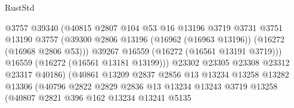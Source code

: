 \begin{lexlean}{RustStd}
\begin{coremodule}
                                        @3757
                                        @39340
                                        (@40815
                                          @2807
                                          @104
                                          @53
                                          @16
                                          @13196
                                          @3719
                                          @3731
                                          @3751
                                          @13190
                                          @3757
                                          (@39300
                                            @2806
                                            @13196
                                            (@16962 (@16963 @13196))
                                            (@16272 (@16968 @2806 @53)))
                                          @39267
                                          @16559
                                          (@16272 (@16561 @13191 @3719)))
                                        @16559
                                        (@16272 (@16561 @13181 @13199)))
                                      @23302
                                      @23305
                                      @23308
                                      @23312
                                      @23317
                                      @40186)
                                    (@40861
                                      @13209
                                      @2837
                                      @2856
                                      @13
                                      @13234
                                      @13258
                                      @13282
                                      @13306
                                      (@40796
                                        @2822
                                        @2829
                                        @2836
                                        @13
                                        @13234
                                        @13243
                                        @3719
                                        @13258
                                        (@40807
                                          @2821
                                          @396
                                          @162
                                          @13234
                                          @13241
                                          @5135

\end{coremodule}
\end{lexlean}
